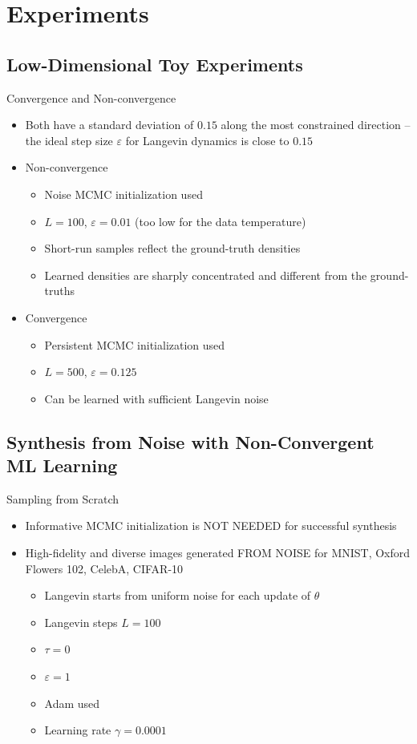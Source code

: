 \documentclass{beamer}
\begin{document}
\section{Experiments}
\subsection{Low-Dimensional Toy Experiments}
\begin{frame}{Convergence and Non-convergence}
\begin{itemize}
\item Both have a standard deviation of $0.15$ along the most constrained direction -- the ideal step size $\varepsilon$ for Langevin dynamics is close to $0.15$
\item Non-convergence
\begin{itemize}
\item Noise MCMC initialization used
\item $L=100$, $\varepsilon=0.01$ (too low for the data temperature)
\item Short-run samples reflect the ground-truth densities
\item Learned densities are sharply concentrated and different from the ground-truths
\end{itemize}
\item Convergence
\begin{itemize}
\item Persistent MCMC initialization used
\item $L=500$, $\varepsilon=0.125$
\item Can be learned with sufficient Langevin noise
\end{itemize}
\end{itemize}
\end{frame}

\subsection{Synthesis from Noise with Non-Convergent ML Learning}

\begin{frame}{Sampling from Scratch}
\begin{itemize}
\item Informative MCMC initialization is NOT NEEDED for successful synthesis
\item High-fidelity and diverse images generated FROM NOISE for MNIST, Oxford Flowers 102, CelebA, CIFAR-10
\begin{itemize}
\item Langevin starts from uniform noise for each update of $\theta$
\item Langevin steps $L=100$
\item $\tau=0$
\item $\varepsilon=1$
\item Adam used
\item Learning rate $\gamma=0.0001$
\end{itemize}
\end{itemize}
\end{frame}
\end{document}
